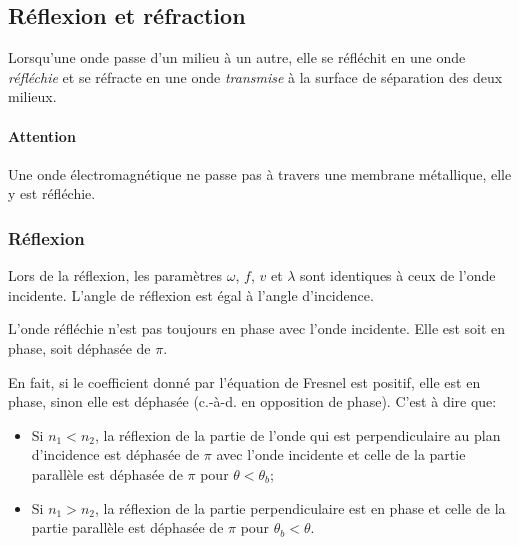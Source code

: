 \subsection{Réflexion et réfraction}
Lorsqu'une onde passe d'un milieu à un autre,
elle se réfléchit en une onde \emph{réfléchie} et se réfracte en une onde
\emph{transmise} à la surface de séparation des deux milieux.

\paragraph{Attention}
Une onde électromagnétique ne passe pas à travers une membrane métallique,
elle y est réfléchie.

\subsubsection{Réflexion}

Lors de la réflexion, les paramètres $\omega$, $f$, $v$ et $\lambda$
sont identiques à ceux de l'onde incidente.
L'angle de réflexion est égal à l'angle d'incidence.

L'onde réfléchie n'est pas toujours en phase avec l'onde incidente.
Elle est soit en phase, soit déphasée de $\pi$.

En fait, si le coefficient donné par l'équation de Fresnel est positif,
elle est en phase, sinon elle est déphasée (c.-à-d. en opposition de phase).
C'est à dire que:
\begin{itemize}
  \item Si $n_1 < n_2$, la réflexion de la partie de l'onde
    qui est perpendiculaire au plan
    d'incidence est déphasée de $\pi$ avec l'onde incidente
    et celle de la partie parallèle est déphasée de $\pi$
    pour $\theta < \theta_b$;
  \item Si $n_1 > n_2$, la réflexion de la partie perpendiculaire est
    en phase et celle de la partie parallèle est déphasée de $\pi$
    pour $\theta_b < \theta$.
\end{itemize}


